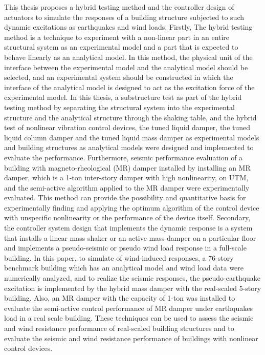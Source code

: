 This thesis proposes a hybrid testing method and the controller design of actuators to simulate the responses of a building structure subjected to such dynamic excitations as earthquakes and wind loads. Firstly, The hybrid testing method is a technique to experiment with a non-linear part in an entire structural system as an experimental model and a part that is expected to behave linearly as an analytical model. In this method, the physical unit of the interface between the experimental model and the analytical model should be selected, and an experimental system should be constructed in which the interface of the analytical model is designed to act as the excitation force of the experimental model. In this thesis, a substructure test as part of the hybrid testing method by separating the structural system into the experimental structure and the analytical structure through the shaking table, and the hybrid test of nonlinear vibration control devices, the tuned liquid damper, the tuned liquid column damper and the tuned liquid mass damper as experimental models and building structures as analytical models were designed and implemented to evaluate the performance. Furthermore, seismic performance evaluation of a building with magneto-rheological (MR) damper installed by installing an MR damper, which is a 1-ton inter-story damper with high nonlinearity, on UTM, and the semi-active algorithm applied to the MR damper were experimentally evaluated. This method can provide the possibility and quantitative basis for experimentally finding and applying the optimum algorithm of the control device with unspecific nonlinearity or the performance of the device itself. Secondary, the controller system design that implements the dynamic response is a system that installs a linear mass shaker or an active mass damper on a particular floor and implements a pseudo-seismic or pseudo wind load response in a full-scale building. In this paper, to simulate of wind-induced responses, a 76-story benchmark building which has an analytical model and wind load data were numerically analyzed, and to realize the seismic responses, the pseudo-earthquake excitation is implemented by the hybrid mass damper with the real-scaled 5-story building. Also, an MR damper with the capacity of 1-ton was installed to evaluate the semi-active control performance of MR damper under earthquakes load in a real scale building. These techniques can be used to assess the seismic and wind resistance performance of real-scaled building structures and to evaluate the seismic and wind resistance performance of buildings with nonlinear control devices.

